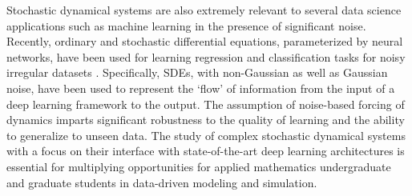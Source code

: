 \documentclass[11pt]{NSFamsart}
\begin{document}
 
Stochastic dynamical systems are also extremely relevant to several data science applications such as machine learning in the presence of significant noise. Recently, ordinary and stochastic differential equations, parameterized by neural networks, have been used for learning regression and classification tasks for noisy irregular datasets \cite{chen2018neural,rubanova2019latent,jia2019neural,tzen2019neural,look2020deterministic,liu2019neural}. Specifically, SDEs, with non-Gaussian as well as Gaussian noise, have been used to represent the `flow' of information from the input of a deep learning framework to the output. The assumption of noise-based forcing of dynamics imparts significant robustness to the quality of learning and the ability to generalize to unseen data. The study of complex stochastic dynamical systems with a focus on their interface with state-of-the-art deep learning architectures is essential for multiplying opportunities for applied mathematics undergraduate and graduate students in data-driven modeling and simulation. 



 
\end{document}
